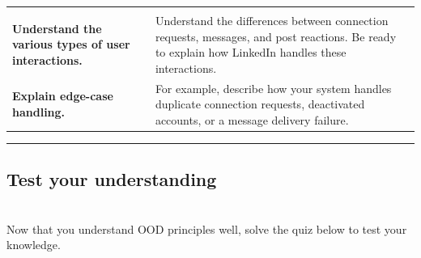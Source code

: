\begin{center}
{\begin{longtable}[]{@{}
>{\raggedright\arraybackslash} p{}
>{\raggedright\arraybackslash} p{}@{}}
\begin{minipage}[t]{\linewidth}
\end{minipage} \\
\begin{minipage}[t]{\linewidth}\raggedright
\textbf{Understand the various types of user interactions.}
\end{minipage} & \begin{minipage}[t]{\linewidth}\raggedright
Understand the differences between connection requests, messages, and post reactions. Be ready to explain how LinkedIn handles these interactions.
\end{minipage} \\
\begin{minipage}[t]{\linewidth}\raggedright
\textbf{Explain edge-case handling.}
\end{minipage} & \begin{minipage}[t]{\linewidth}\raggedright
For example, describe how your system handles duplicate connection requests, deactivated accounts, or a message delivery failure.
\end{minipage} \\
\end{longtable}
}
\end{center}

\begin{center}\rule{0.5\linewidth}{0.5pt}\end{center}

\subsection{Test your understanding}\label{MfrrfBDSimkdS1AwE5P5T}
\\
Now that you understand OOD principles well, solve the quiz below to test your knowledge.

